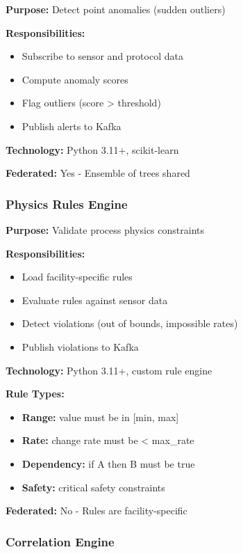 \documentclass[12pt,a4paper]{article}
\begin{document}
\textbf{Purpose:} Detect point anomalies (sudden outliers)

\textbf{Responsibilities:}
\begin{itemize}[leftmargin=1cm,itemsep=0pt]
    \item Subscribe to sensor and protocol data
    \item Compute anomaly scores
    \item Flag outliers (score > threshold)
    \item Publish alerts to Kafka
\end{itemize}

\textbf{Technology:} Python 3.11+, scikit-learn

\textbf{Federated:} Yes - Ensemble of trees shared

\subsubsection{Physics Rules Engine}

\textbf{Purpose:} Validate process physics constraints

\textbf{Responsibilities:}
\begin{itemize}[leftmargin=1cm,itemsep=0pt]
    \item Load facility-specific rules
    \item Evaluate rules against sensor data
    \item Detect violations (out of bounds, impossible rates)
    \item Publish violations to Kafka
\end{itemize}

\textbf{Technology:} Python 3.11+, custom rule engine

\textbf{Rule Types:}
\begin{itemize}[leftmargin=1cm,itemsep=0pt]
    \item \textbf{Range:} value must be in [min, max]
    \item \textbf{Rate:} change rate must be < max\_rate
    \item \textbf{Dependency:} if A then B must be true
    \item \textbf{Safety:} critical safety constraints
\end{itemize}

\textbf{Federated:} No - Rules are facility-specific


\subsubsection{Correlation Engine}
\end{document}
